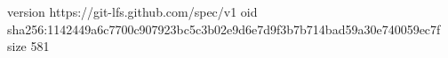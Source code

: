 version https://git-lfs.github.com/spec/v1
oid sha256:1142449a6c7700c907923bc5c3b02e9d6e7d9f3b7b714bad59a30e740059ec7f
size 581
